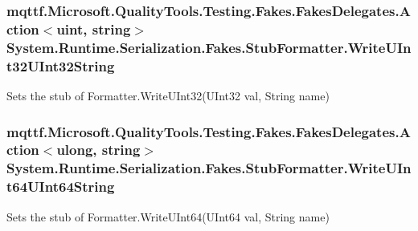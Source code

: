 \hypertarget{class_system_1_1_runtime_1_1_serialization_1_1_fakes_1_1_stub_formatter_ab5c6047c048bf0adb05c7b54ab3ceab0}{
\subsubsection[{Write\-U\-Int32\-U\-Int32\-String}]{\setlength{\rightskip}{0pt plus 5cm}mqttf.\-Microsoft.\-Quality\-Tools.\-Testing.\-Fakes.\-Fakes\-Delegates.\-Action$<$uint, string$>$ System.\-Runtime.\-Serialization.\-Fakes.\-Stub\-Formatter.\-Write\-U\-Int32\-U\-Int32\-String}}\label{class_system_1_1_runtime_1_1_serialization_1_1_fakes_1_1_stub_formatter_ab5c6047c048bf0adb05c7b54ab3ceab0}


Sets the stub of Formatter.\-Write\-U\-Int32(\-U\-Int32 val, String name)

\hypertarget{class_system_1_1_runtime_1_1_serialization_1_1_fakes_1_1_stub_formatter_a959aa57e49013f86d50772dcf917428d}{
\subsubsection[{Write\-U\-Int64\-U\-Int64\-String}]{\setlength{\rightskip}{0pt plus 5cm}mqttf.\-Microsoft.\-Quality\-Tools.\-Testing.\-Fakes.\-Fakes\-Delegates.\-Action$<$ulong, string$>$ System.\-Runtime.\-Serialization.\-Fakes.\-Stub\-Formatter.\-Write\-U\-Int64\-U\-Int64\-String}}\label{class_system_1_1_runtime_1_1_serialization_1_1_fakes_1_1_stub_formatter_a959aa57e49013f86d50772dcf917428d}


Sets the stub of Formatter.\-Write\-U\-Int64(\-U\-Int64 val, String name)

